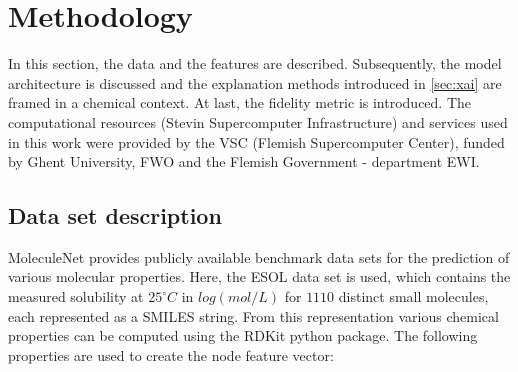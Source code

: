 \chapter{Methodology}


In this section, the data and the features are described. 
Subsequently, the model architecture is discussed and the explanation methods 
introduced in \cref{sec:xai} are framed in a chemical context. At last, 
the fidelity metric is introduced. The computational resources (Stevin Supercomputer 
Infrastructure) and services used in this work were provided by the VSC (Flemish 
Supercomputer Center), funded by Ghent University, FWO and the Flemish Government 
- department EWI.


\section{Data set description}


MoleculeNet provides publicly available benchmark data sets for the prediction of 
various molecular properties.\cite{wu2018moleculenet} Here, the ESOL data set is used,
which contains the measured solubility at $25^{\circ} C$ in $log(mol/L)$ for $1110$ 
distinct small molecules, each represented as a SMILES string.\cite{delaney2004esol}
From this representation various chemical properties can be computed using the RDKit python package\cite{landrum2010r}. 
The following properties are used to create the node feature vector: \cite{wu2023chemistry}

